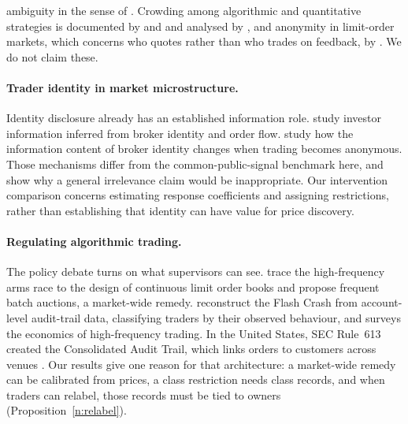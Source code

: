 \documentclass[12pt]{article}
\theoremstyle{definition}
\theoremstyle{remark}
\begin{document}
ambiguity in the sense of \citet{manski2000}. Crowding among algorithmic and quantitative strategies is documented by \citet{chaboud2014} and \citet{khandani2011} and analysed by \citet{stein2009}, and anonymity in limit-order markets, which concerns who quotes rather than who trades on feedback, by \citet{foucault2007}. We do not claim these.

\paragraph{Trader identity in market microstructure.} Identity disclosure already has an established information role. \citet{linnainmaa2012} study investor information inferred from broker identity and order flow. \citet{frino2010} study how the information content of broker identity changes when trading becomes anonymous. Those mechanisms differ from the common-public-signal benchmark here, and show why a general irrelevance claim would be inappropriate. Our intervention comparison concerns estimating response coefficients and assigning restrictions, rather than establishing that identity can have value for price discovery.

\paragraph{Regulating algorithmic trading.} The policy debate turns on what supervisors can see. \citet{budish2015} trace the high-frequency arms race to the design of continuous limit order books and propose frequent batch auctions, a market-wide remedy. \citet{kirilenko2017} reconstruct the Flash Crash from account-level audit-trail data, classifying traders by their observed behaviour, and \citet{menkveld2016} surveys the economics of high-frequency trading. In the United States, SEC Rule~613 created the Consolidated Audit Trail, which links orders to customers across venues \citep{sec2012cat}. Our results give one reason for that architecture: a market-wide remedy can be calibrated from prices, a class restriction needs class records, and when traders can relabel, those records must be tied to owners (Proposition~\ref{n:relabel}).
\end{document}
